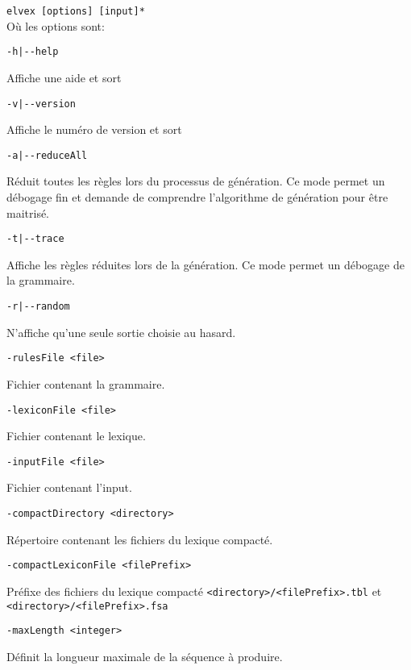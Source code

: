\documentclass[11pt]{article}
\begin{document}
\noindent
\verb#elvex [options] [input]*#\\

Où les options sont:

\begin{description}
\item \verb#-h|--help#

Affiche une aide et sort

\item \verb#-v|--version#

Affiche le numéro de version et sort

\item \verb#-a|--reduceAll#

  Réduit toutes les règles lors du processus de génération. Ce mode
  permet un débogage fin et demande de comprendre l'algorithme de
  génération pour être maitrisé.

\item \verb#-t|--trace#

  Affiche les règles réduites lors de la génération. Ce mode permet un
  débogage de la grammaire.

\item \verb#-r|--random#
  
  N'affiche qu'une seule sortie choisie au hasard.
  
\item \verb#-rulesFile <file>#
  
  Fichier contenant la grammaire. 
  
\item \verb#-lexiconFile <file>#
  
  Fichier contenant le lexique.

\item \verb#-inputFile <file>#
  
  Fichier contenant l'input. 
  
\item \verb#-compactDirectory <directory>#

  Répertoire contenant les fichiers du lexique compacté.

\item \verb#-compactLexiconFile <filePrefix>#

  Préfixe des fichiers du lexique compacté
  \verb#<directory>/<filePrefix>.tbl# et
  \verb#<directory>/<filePrefix>.fsa#
  
\item \verb#-maxLength <integer>#

  Définit la longueur maximale de la séquence à produire.


\end{description}
\end{document}

